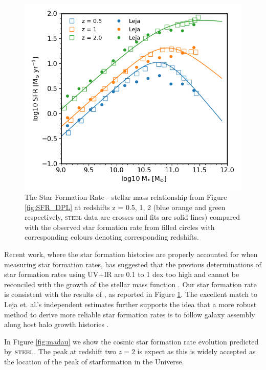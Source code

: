 \begin{figure}[h]
    \centering
    \includegraphics[width = 0.8\linewidth]{Figures/Chapter4/HMC_DPL_wLeja.png}
    \caption{The Star Formation Rate - stellar mass relationship from Figure \ref{fig:SFR_DPL} at redshifts z = 0.5, 1, 2 (blue orange and green respectively, \textsc{steel} data are crosses and fits are solid lines) compared with the observed star formation rate from \citet{Leja2019AnSurvey} filled circles with corresponding colours denoting corresponding redshifts.}
    \label{fig:SFR_L18}
\end{figure}

Recent work, where the star formation histories are properly accounted for when measuring star formation rates, has suggested that the previous determinations of star formation rates using UV+IR are 0.1 to 1 dex too high \citep{Leja2019AnSurvey} and cannot be reconciled with the growth of the stellar mass function \citep{Leja2015ReconcilingFunction, Lapi2017StellarEquation}. Our star formation rate is consistent with the results of \citet{Leja2019AnSurvey}, as reported in Figure \ref{fig:SFR_L18}. The excellent match to Leja et. al.'s independent estimates further supports the idea that a more robust method to derive more reliable star formation rates is to follow galaxy assembly along host halo growth histories \citep[see e.g.,][]{Moster2018Emerge10}. 

In Figure \ref{fig:madau} we show the cosmic star formation rate evolution predicted by $\textsc{steel}$. The peak at redshift two $z = 2$ is expect as this is widely accepted as the location of the peak of starformation in the Universe.

